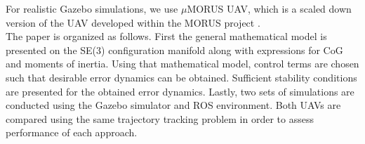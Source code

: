 For realistic Gazebo simulations, we use $\mu$MORUS UAV, which is a scaled down version of the UAV developed within the MORUS project \cite{MORUSweb}. \\
The paper is organized as follows. First the general mathematical model is presented on the SE(3) configuration manifold along with expressions for CoG and moments of inertia. Using that mathematical model, control terms are chosen such that desirable error dynamics can be obtained. Sufficient stability conditions are presented for the obtained error dynamics. Lastly, two sets of simulations are conducted using the Gazebo simulator and ROS environment. Both UAVs are compared using the same trajectory tracking problem in order to assess performance of each approach.